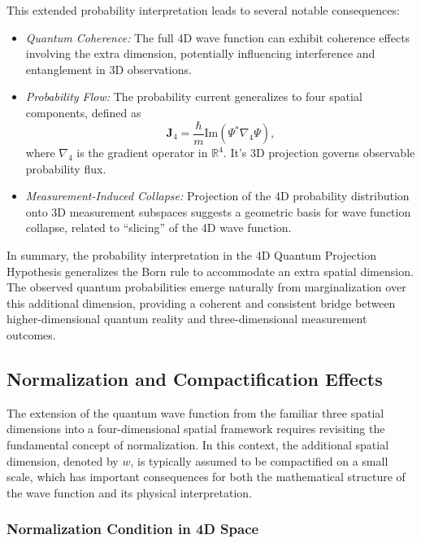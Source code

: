 \documentclass[12pt]{article}
\begin{document}
This extended probability interpretation leads to several notable consequences:

\begin{itemize}
    \item \emph{Quantum Coherence:} The full 4D wave function can exhibit coherence effects involving the extra dimension, potentially influencing interference and entanglement in 3D observations.
    \item \emph{Probability Flow:} The probability current generalizes to four spatial components, defined as
    \begin{equation}
        \mathbf{J}_4 = \frac{\hbar}{m} \text{Im} \left( \Psi^* \nabla_4 \Psi \right),
    \end{equation}
    where \(\nabla_4\) is the gradient operator in \(\mathbb{R}^4\). It's 3D projection governs observable probability flux.
    \item \emph{Measurement-Induced Collapse:} Projection of the 4D probability distribution onto 3D measurement subspaces suggests a geometric basis for wave function collapse, related to “slicing” of the 4D wave function.
\end{itemize}

\medskip

In summary, the probability interpretation in the 4D Quantum Projection Hypothesis generalizes the Born rule to accommodate an extra spatial dimension. The observed quantum probabilities emerge naturally from marginalization over this additional dimension, providing a coherent and consistent bridge between higher-dimensional quantum reality and three-dimensional measurement outcomes.


\subsection{Normalization and Compactification Effects}

The extension of the quantum wave function from the familiar three spatial dimensions into a four-dimensional spatial framework requires revisiting the fundamental concept of normalization. In this context, the additional spatial dimension, denoted by \( w \), is typically assumed to be compactified on a small scale, which has important consequences for both the mathematical structure of the wave function and its physical interpretation.

\subsubsection*{Normalization Condition in 4D Space}
\end{document}
